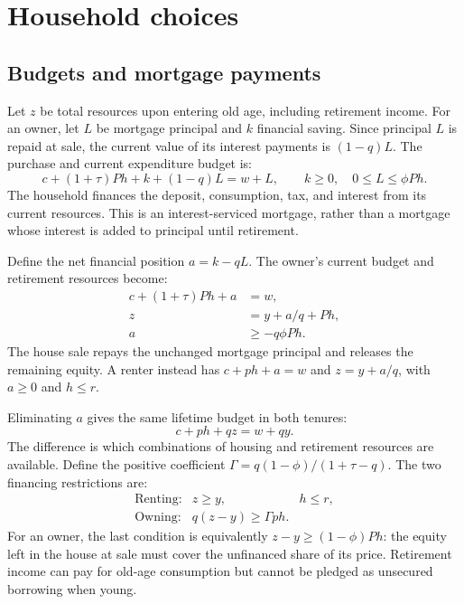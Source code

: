 \documentclass[11pt]{article}
\begin{document}
\section{Household choices}

\subsection{Budgets and mortgage payments}

Let $z$ be total resources upon entering old age, including retirement income.
For an owner, let $L$ be mortgage principal and $k$ financial saving. Since
principal $L$ is repaid at sale, the current value of its interest payments
is $(1-q)L$. The purchase and current expenditure budget is:
\begin{equation}
c+(1+\tau)Ph+k+(1-q)L=w+L,
\qquad k\ge0,\quad 0\le L\le\phi Ph.
\label{eq:mortgage_cash}
\end{equation}
The household finances the deposit, consumption, tax, and interest from its
current resources. This is an interest-serviced mortgage, rather than a
mortgage whose interest is added to principal until retirement.

Define the net financial position $a=k-qL$. The owner's current budget and
retirement resources become:
\begin{equation}
\begin{split}
c+(1+\tau)Ph+a&=w,\\
z&=y+a/q+Ph,\\
a&\ge-q\phi Ph.
\end{split}
\label{eq:new_young_owner}
\end{equation}
The house sale repays the unchanged mortgage principal and releases the
remaining equity. A renter instead has $c+ph+a=w$ and $z=y+a/q$, with
$a\ge0$ and $h\le r$.

Eliminating $a$ gives the same lifetime budget in both tenures:
\begin{equation}
c+ph+qz=w+qy.
\label{eq:unified_budget}
\end{equation}
The difference is which combinations of housing and retirement resources are
available. Define the positive coefficient
$\Gamma=q(1-\phi)/(1+\tau-q)$. The two financing restrictions are:
\begin{equation}
\begin{array}{lll}
\text{Renting:}&z\ge y,&h\le r,\\[2pt]
\text{Owning:}&q(z-y)\ge\Gamma ph.&
\end{array}
\label{eq:tenure_constraints}
\end{equation}
For an owner, the last condition is equivalently
$z-y\ge(1-\phi)Ph$: the equity left in the house at sale must cover the
unfinanced share of its price. Retirement income can pay for old-age
consumption but cannot be pledged as unsecured borrowing when young.
\end{document}
